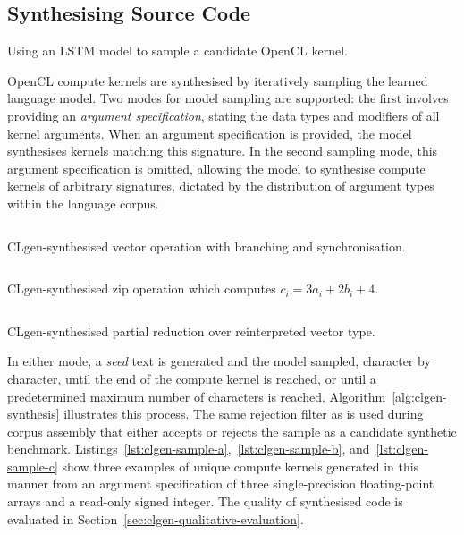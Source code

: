 \subsection{Synthesising Source Code}
\label{subsec:synthesizing-opencl}

\begin{algorithm}
  
  \caption[Sampling a candidate kernel from a seed text]{Using an LSTM model to sample a candidate OpenCL kernel.}
  \label{alg:clgen-synthesis}
\end{algorithm}

OpenCL compute kernels are synthesised by iteratively sampling the learned language model. Two modes for model sampling are supported: the first involves providing an \emph{argument specification}, stating the data types and modifiers of all kernel arguments. When an argument specification is provided, the model synthesises kernels matching this signature. In the second sampling mode, this argument specification is omitted, allowing the model to synthesise compute kernels of arbitrary signatures, dictated by the distribution of argument types within the language corpus.

\begin{listing}
  \inputminted{opencl_lexer.py:OpenCLLexer -x}{lst/clgen-sample-a.cl}
  \caption[Synthesised vector operation with branching and synchronisation]{CLgen-synthesised vector operation with branching and synchronisation.}
  \label{lst:clgen-sample-a}
\end{listing}

\begin{listing}
  \inputminted{opencl_lexer.py:OpenCLLexer -x}{lst/clgen-sample-b.cl}
  \caption[Synthesised zip operation]{CLgen-synthesised zip operation which computes $c_i = 3a_i + 2b_i + 4$.}
  \label{lst:clgen-sample-b}
\end{listing}

\begin{listing}
  \inputminted{opencl_lexer.py:OpenCLLexer -x}{lst/clgen-sample-c.cl}
  \caption[Synthesised partial reduction operation]{CLgen-synthesised partial reduction over reinterpreted vector type.}
  \label{lst:clgen-sample-c}
\end{listing}

In either mode, a \emph{seed} text is generated and the model sampled, character by character, until the end of the compute kernel is reached, or until a predetermined maximum number of characters is reached. Algorithm~\ref{alg:clgen-synthesis} illustrates this process. The same rejection filter as is used during corpus assembly that either accepts or rejects the sample as a candidate synthetic benchmark. Listings~\ref{lst:clgen-sample-a},~\ref{lst:clgen-sample-b}, and~\ref{lst:clgen-sample-c} show three examples of unique compute kernels generated in this manner from an argument specification of three single-precision floating-point arrays and a read-only signed integer. The quality of synthesised code is evaluated in Section~\ref{sec:clgen-qualitative-evaluation}.


